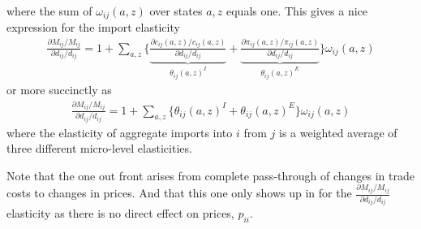 \documentclass[12pt,pdftex]{article}
\begin{document}
\begin{onehalfspacing}
\begin{align}
\end{align}
where the sum of $\omega_{ij}(a,z)$ over states $a,z$ equals one. This gives a nice expression for the import elasticity
\begin{align}
\frac{\partial  M_{ij} / M_{ij}}{\partial d_{ij} / d_{ij}} = 1 + \sum_{a,z} \bigg \{ \underbrace{ \frac{\partial c_{ij}(a,z)/ c_{ij}(a,z)}{\partial d_{ij} / d_{ij}} }_{\theta_{ij}(a,z)^{I}}+
\underbrace{\frac{\partial \pi_{ij}(a,z) / \pi_{ij}(a,z)}{\partial d_{ij} / d_{ij}} }_{\theta_{ij}(a,z)^{E}} \bigg \} \omega_{ij}(a,z)
\end{align}
or more succinctly as
\begin{align}
\frac{\partial  M_{ij} / M_{ij}}{\partial d_{ij} / d_{ij}} = 1 + \sum_{a,z} \bigg \{ \theta_{ij}(a,z)^{I} + \theta_{ij}(a,z)^{E} \bigg \}\omega_{ij}(a,z)
\end{align}
where the elasticity of aggregate imports into $i$ from $j$ is a weighted average of three different micro-level elasticities.

Note that the one out front arises from complete pass-through of changes in trade costs to changes in prices. And that this one only shows up in for the $\frac{\partial  M_{ij} / M_{ij}}{\partial d_{ij} / d_{ij}} $ elasticity as there is no direct effect on prices, $p_{ii}$.


\end{onehalfspacing}
\end{document}
